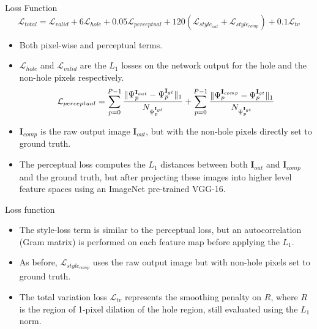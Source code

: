 \documentclass[aspectratio=43]{beamer}
\begin{document}
	
	
	
	\begin{frame}{Loss Function}
		\centering
		\begin{equation*}
				\mathcal{L}_{total} = 
				\mathcal{L}_{valid} + 6\mathcal{L}_{hole} + 0.05\mathcal{L}_{perceptual}
				+ 120(\mathcal{L}_{style_{out}} + \mathcal{L}_{style_{comp}}) + 0.1\mathcal{L}_{tv}
		\end{equation*}
		\begin{itemize}
			\item Both pixel-wise and perceptual terms.
			\item $\mathcal{L}_{hole}$ and $\mathcal{L}_{valid}$ are the $L_1$ losses on the network output for the hole and the non-hole pixels respectively.
		\begin{equation*}
			\centering
			\mathcal{L}_{perceptual} = \sum_{p=0}^{P-1} \frac{\| \Psi_{p}^{\mathbf{I}_{out}} - \Psi_{p}^{\mathbf{I}_{gt}} \|_1}{N_{\Psi_{p}^{\mathbf{I}_{gt}}}}
			+ \sum_{p=0}^{P-1} \frac{\|  \Psi_{p}^{\mathbf{I}_{comp}} - \Psi_{p}^{\mathbf{I}_{gt}} \|_1}{N_{\Psi_{p}^{\mathbf{I}_{gt}}}}
		\end{equation*}
			\item $\mathbf{I}_{comp}$ is the raw output image $\mathbf{I}_{out}$, but with the non-hole pixels directly set to ground truth.
			\item The perceptual loss computes the $L_1$ distances between both $\mathbf{I}_{out}$ and $\mathbf{I}_{comp}$ and the ground truth, but after projecting these images into higher level feature spaces using an ImageNet pre-trained VGG-16.
		\end{itemize}
	\end{frame}
	
	
	\begin{frame}{Loss function}
		\centering
		\begin{itemize}
			\item The style-loss term is similar to the perceptual loss, but an autocorrelation (Gram matrix) is performed on each feature map before applying the $L_1$.
			\item As before, $\mathcal{L}_{style_{comp}}$ uses the raw output image but with non-hole pixels set to ground truth.
			\item The total variation loss $\mathcal{L}_{tv}$ represents the smoothing penalty on $R$, where $R$ is the region of 1-pixel dilation of the hole region, still evaluated using the $L_1$ norm.
		\end{itemize}
	\end{frame}
	
\end{document}

